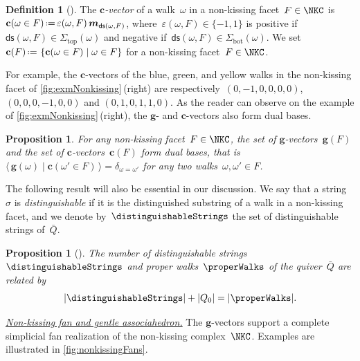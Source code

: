 \documentclass{amsart}
\newtheorem{proposition}[theorem]{Proposition}
\theoremstyle{definition}
\newtheorem{definition}[theorem]{Definition}
\renewcommand{\b}[1]{{\boldsymbol{#1}}} %
\newcommand{\set}[2]{\left\{ #1 \;\middle|\; #2 \right\}} %
\newcommand{\bigdotprod}[2]{\big\langle \, #1 \; \big| \; #2 \, \big\rangle} %
\newcommand{\eqdef}{\mbox{\,\raisebox{0.2ex}{\scriptsize\ensuremath{\mathrm:}}\ensuremath{=}\,}} %
\newcommand{\darkblue}{\color{darkblue}} %
\newcommand{\defn}[1]{\textsl{\darkblue #1}} %
\newcommand{\para}[1]{\medskip\noindent\uline{\textit{#1.}}} %
\newcommand{\multiplicityVector}{\b{m}} %
\newcommand{\gvector}[1]{\b{g}(#1)} %
\newcommand{\gvectors}[1]{\b{g}(#1)} %
\newcommand{\cvector}[2]{\mathbf{c}(#2 \in #1)} %
\newcommand{\cvectors}[1]{\mathbf{c}(#1)} %
\newcommand{\quiver}{\bar Q} %
\renewcommand{\top}{\mathrm{top}} %
\newcommand{\bottom}{\mathrm{bot}} %
\newcommand{\distinguishedString}[2]{\mathsf{ds}(#1,#2)} %
\newcommand{\distinguishedSign}[2]{\varepsilon(#1,#2)} %
\begin{document}
\begin{definition}[{\cite[Def.~{4.11}]{PaluPilaudPlamondon-nonkissing}}]
The \defn{$\b{c}$-vector} of a walk~$\omega$ in a non-kissing facet~${F \in \NKC}$ is~${\cvector{F}{\omega} \eqdef \distinguishedSign{\omega}{F} \, \multiplicityVector_{\distinguishedString{\omega}{F}}}$, where~$\distinguishedSign{\omega}{F} \in \{-1,1\}$ is positive if~${\distinguishedString{\omega}{F} \in \Sigma_\top(\omega)}$ and negative if~${\distinguishedString{\omega}{F} \in \Sigma_\bottom(\omega)}$.
We set~$\cvectors{F} \eqdef \set{\cvector{F}{\omega}}{\omega \in F}$ for a non-kissing facet~$F \in \NKC$.
\end{definition}

For example, the $\b{c}$-vectors of the blue, green, and yellow walks in the non-kissing facet of \cref{fig:exmNonkissing}\,(right) are respectively~$(0, -1, 0, 0, 0, 0)$, $(0, 0, 0, -1, 0, 0)$ and $(0, 1, 0, 1, 1, 0)$.
As the reader can observe on the example of \cref{fig:exmNonkissing}\,(right), the $\b{g}$- and $\b{c}$-vectors also form dual bases.

\begin{proposition}
\label{prop:gvectorscvectorsDualBasesGentle}
For any non-kissing facet~$F \in \NKC$, the set of $\b{g}$-vectors~$\gvectors{F}$ and the set of $\b{c}$-vectors~$\cvectors{F}$ form dual bases, that is
\(
{\bigdotprod{\gvector{\omega}}{\cvector{F}{\omega'}} = \delta_{\omega=\omega'}}
\)
for any two walks~$\omega, \omega' \in F$.
\end{proposition}

The following result will also be essential in our discussion.
We say that a string~$\sigma$ is \defn{distinguishable} if it is the distinguished substring of a walk in a non-kissing facet, and we denote by~$\distinguishableStrings$ the set of distinguishable strings of~$\quiver$.

\begin{proposition}[{\cite[Prop.~3.68]{PaluPilaudPlamondon-nonkissing}}]
\label{prop:bijectionStringsWalks}
The number of distinguishable strings~$\distinguishableStrings$ and proper walks~$\properWalks$ of the quiver~$\quiver$ are related by
\[
|\distinguishableStrings| + |Q_0| = |\properWalks|.
\]
\end{proposition}

\para{Non-kissing fan and gentle associahedron}
%
The $\b{g}$-vectors support a complete simplicial fan realization of the non-kissing complex~$\NKC$.
Examples are illustrated in \cref{fig:nonkissingFans}.
\end{document}
